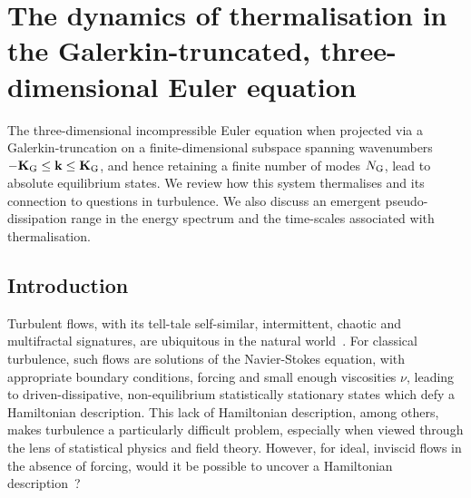 \documentclass[../Rajarshi-thesis-draft.tex]{subfiles}
\begin{document}
\chapter{The dynamics of thermalisation in the Galerkin-truncated, three-dimensional Euler equation}
\label{trunc-euler}


\begin{summary}
The {three-dimensional incompressible Euler equation}
when projected via a Galerkin-truncation on a finite-dimensional
subspace spanning wavenumbers $-{\bf K}_{\rm G} \le {\bf k} \le {\bf
K}_{\rm G}$, and hence retaining a finite number of modes $N_{\rm G}$,
lead to absolute equilibrium states. We review how this system
thermalises and its  connection to questions in turbulence. We also
discuss an emergent pseudo-dissipation range in the energy spectrum and
the time-scales associated with thermalisation.
\end{summary}

\section{Introduction}

Turbulent flows, with its tell-tale self-similar, intermittent, chaotic and
	multifractal signatures, are ubiquitous in the natural world~\cite{Frisch-Book}.
	For classical turbulence, such flows are solutions of the Navier-Stokes
	equation, with appropriate boundary conditions, forcing and small
	enough viscosities $\nu$, leading to driven-dissipative,
	non-equilibrium {statistically} stationary states which defy a Hamiltonian description.
	This lack of Hamiltonian description, among others, makes turbulence a particularly difficult problem, especially when viewed through
	the lens of statistical physics and field theory. However, for ideal,
	inviscid flows in the absence of forcing, would it be
	possible to uncover a Hamiltonian description~\cite{MorrisonRMP}?
\end{document}
